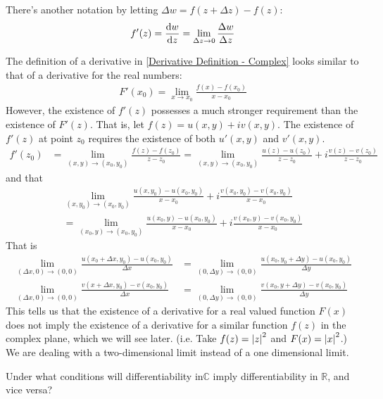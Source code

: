 \documentclass[12pt, english]{book}
\begin{document}
	There's another notation by letting $\Delta w = f(z + \Delta z) - f(z)$:
	\begin{align*}
		f'(z) = \dv{w}{z}  = \lim_{\Delta z \rightarrow 0} \frac{\Delta w}{\Delta z}
	\end{align*}
	\begin{observation}
		The definition of a derivative in \cref{Derivative Definition - Complex} looks similar to that of a derivative for the real numbers:
		\begin{align*}
			F'(x_0) = \lim_{x \rightarrow x_0} \frac{f(x) - f(x_0)}{x - x_0}
		\end{align*}
		However, the existence of $f'(z)$ possesses a much stronger requirement than the existence of $F'(z)$. That is, let $f(z) = u(x,y) + iv(x,y)$. The existence of $f'(z)$ at point $z_0$ requires the existence of both $u'(x,y)$ and $v'(x,y)$.
		\begin{align*}
			f'(z_0) &= \lim_{(x,y) \rightarrow (x_0, y_0)} \frac{f(z) - f(z_0)}{z - z_0} = \lim_{(x,y) \rightarrow (x_0, y_0)} \frac{u(z) - u(z_0)}{z - z_0} + i \frac{v(z) - v(z_0)}{z - z_0}
		\end{align*}
		and that 
		\begin{align*}
			\lim_{(x,y_0) \rightarrow (x_0, y_0)} \frac{u(x, y_0) - u(x_0, y_0)}{x - x_0} + i \frac{v(x_0, y_0) - v(x_0, y_0)}{x-x_0} \\ 
			= 
			\lim_{(x_0,y) \rightarrow (x_0, y_0)} \frac{u(x_0, y) - u(x_0, y_0)}{x - x_0} + i \frac{v(x_0,y) - v(x_0,y_0)}{x-x_0}
		\end{align*}
		That is
		\begin{align*}
			\lim_{(\Delta x, 0) \rightarrow (0,0)} \frac{u(x_0+\Delta x, y_0) - u(x_0,y_0)}{\Delta x}
			&= \lim_{(0, \Delta y) \rightarrow (0,0)} \frac{u(x_0, y_0 +\Delta y) - u(x_0,y_0)}{\Delta y} \\
			\lim_{(\Delta x, 0) \rightarrow (0,0)} \frac{v(x+\Delta x, y_0) - v(x_0,y_0)}{\Delta x}
			&= \lim_{(0, \Delta y) \rightarrow (0,0)} \frac{v(x_0, y+\Delta y) - v(x_0,y_0)}{\Delta y}
		\end{align*}
		This tells us that the existence of a derivative for a real valued function $F(x)$ does not imply the existence of a derivative for a similar function $f(z)$ in the complex plane, which we will see later. (i.e. Take $f(z) = \abs{z}^2$ and $F(x) = \abs{x}^2$.) We are dealing with a two-dimensional limit instead of a one dimensional limit.
	\end{observation}

	\begin{question}
		Under what conditions will differentiability in\(\mathbb{C}\) imply differentiability in \(\mathbb{R}\), and vice versa?
	\end{question}
	
\end{document}

